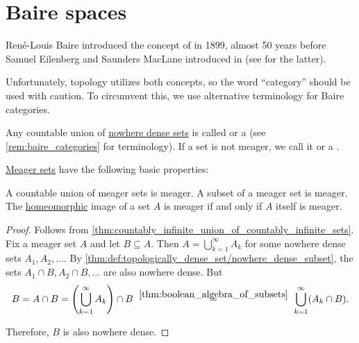 \section{Baire spaces}\label{sec:baire_spaces}

\begin{remark}\label{rem:baire_categories}
  René-Louis Baire introduced the concept of  in 1899, almost 50 years before Samuel Eilenberg and Saunders MacLane introduced  in \cite{EilenbergMacLane1945Equivalences} (see  for the latter).

  Unfortunately, topology utilizes both concepts, so the word \enquote{category} should be used with caution. To circumvent this, we use alternative terminology for Baire categories.
\end{remark}

\begin{definition}\label{def:meager_set}
  Any countable union of \hyperref[def:topologically_dense_set]{nowhere dense sets} is called  or a  (see \cref{rem:baire_categories} for terminology). If a set is not meager, we call it  or a .
\end{definition}

\begin{proposition}\label{thm:def:meager_set}
  \hyperref[def:meager_set]{Meager sets} have the following basic properties:
  \begin{thmenum}
     A countable union of meager sets is meager.
     A subset of a meager set is meager.
     The \hyperref[def:homeomorphism]{homeomorphic} image of a set \( A \) is meager if and only if \( A \) itself is meager.
  \end{thmenum}
\end{proposition}
\begin{proof}
   Follows from \cref{thm:countably_infinite_union_of_countably_infinite_sets}.
   Fix a meager set \( A \) and let \( B \subseteq A \). Then \( A = \bigcup_{k=1}^\infty A_k \) for some nowhere dense sets \( A_1, A_2, \ldots \). By \cref{thm:def:topologically_dense_set/nowhere_dense_subset}, the sets \( A_1 \cap B, A_2 \cap B, \ldots \) are also nowhere dense. But
  \begin{equation*}
    B
    =
    A \cap B
    =
    \left(\bigcup_{k=1}^\infty A_k \right) \cap B
    \reloset {\ref{thm:boolean_algebra_of_subsets}} =
    \bigcup_{k=1}^\infty (A_k \cap B).
  \end{equation*}

  Therefore, \( B \) is also nowhere dense.

\end{proof}

